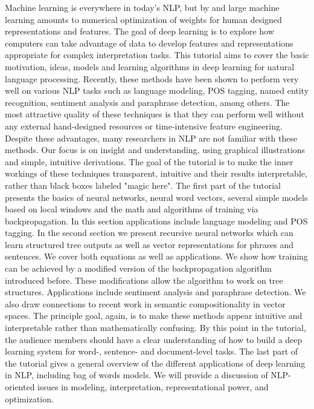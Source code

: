 Machine learning is everywhere in today's NLP, but by and large machine learning amounts to numerical optimization of weights for human designed representations and features. The goal of deep learning is to explore how computers can take advantage of data to develop features and representations appropriate for complex interpretation tasks. This tutorial aims to cover the basic motivation, ideas, models and learning algorithms in deep learning for natural language processing. Recently, these methods have been shown to perform very well on various NLP tasks such as language modeling, POS tagging, named entity recognition, sentiment analysis and paraphrase detection, among others. The most attractive quality of these techniques is that they can perform well without any external hand-designed resources or time-intensive feature engineering. Despite these advantages, many researchers in NLP are not familiar with these methods. Our focus is on insight and understanding, using graphical illustrations and simple, intuitive derivations. The goal of the tutorial is to make the inner workings of these techniques transparent, intuitive and their results interpretable, rather than black boxes labeled "magic here". The first part of the tutorial presents the basics of neural networks, neural word vectors, several simple models based on local windows and the math and algorithms of training via backpropagation. In this section applications include language modeling and POS tagging. In the second section we present recursive neural networks which can learn structured tree outputs as well as vector representations for phrases and sentences. We cover both equations as well as applications. We show how training can be achieved by a modified version of the backpropagation algorithm introduced before. These modifications allow the algorithm to work on tree structures. Applications include sentiment analysis and paraphrase detection. We also draw connections to recent work in semantic compositionality in vector spaces. The principle goal, again, is to make these methods appear intuitive and interpretable rather than mathematically confusing. By this point in the tutorial, the audience members should have a clear understanding of how to build a deep learning system for word-, sentence- and document-level tasks. The last part of the tutorial gives a general overview of the different applications of deep learning in NLP, including bag of words models. We will provide a discussion of NLP-oriented issues in modeling, interpretation, representational power, and optimization.
